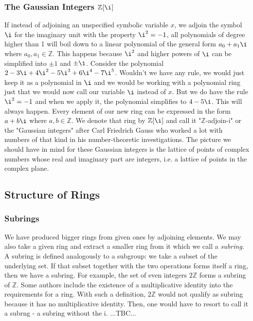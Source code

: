 \subsubsection{The Gaussian Integers $\mathbb{Z}[\i]$}
If instead of adjoining an unspecified symbolic variable $x$, we adjoin the symbol $\i$ for the imaginary unit with the property $\i^2 = -1$, all polynomials of degree higher than 1 will boil down to a linear polynomial of the general form $a_0 + a_1 \i$ where $a_0,a_1 \in \mathbb{Z}$. This happens because $\i^2$ and higher powers of $\i$ can be simplified into $\pm 1$ and $\pm \i$. Consider the polynomial $2 - 3 \i + 4 \i^2 - 5 \i^3 + 6 \i^4 - 7 \i^5$. Wouldn't we have any rule, we would just keep it as a polynomial in $\i$ and we would be working with a polynomial ring just that we would now call our variable $\i$ instead of $x$. But we do have the rule $\i^2 = -1$ and when we apply it, the polynomial simplifies to $4 - 5 \i$. This will always happen. Every element of our new ring can be expressed in the form $a + b \i$ where $a,b \in \mathbb{Z}$. We denote that ring by $\mathbb{Z}[\i]$ and call it "$\mathbb{Z}$-adjoin-i" or the "Gaussian integers" after Carl Friedrich Gauss who worked a lot with numbers of that kind in his number-theoretic investigations. The picture we should have in mind for these Gaussian integers is the lattice of points of complex numbers whose real and imaginary part are integers, i.e. a lattice of points in the complex plane.


\subsection{Structure of Rings}

\subsubsection{Subrings}
We have produced bigger rings from given ones by adjoining elements. We may also take a given ring and extract a smaller ring from it which we call a \emph{subring}. A subring is defined analogously to a subgroup: we take a subset of the underlying set. If that subset together with the two operations forms itself a ring, then we have a subring. For example, the set of even integers $2 \mathbb{Z}$ forms a subring of $\mathbb{Z}$. Some authors include the existence of a multiplicative identity into the requirements for a ring. With such a definition, $2 \mathbb{Z}$ would not qualify as subring because it has no multiplicative identity. Then, one would have to resort to call it a subrng - a subring without the i. ...TBC...

